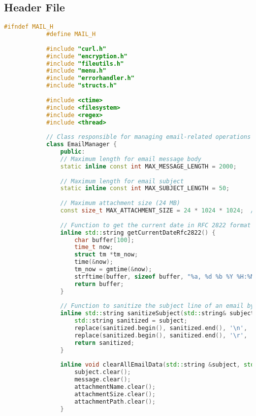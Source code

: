 \documentclass{article}
\begin{document}
	\subsection*{Header File}
	\begin{mdframed}[backgroundcolor=background, hidealllines=false, innerleftmargin=15pt, innerrightmargin=5pt, innertopmargin=0pt, innerbottommargin=-5pt, linecolor=accent]
		\begin{lstlisting}[language=C++]
			#ifndef MAIL_H
			#define MAIL_H
			
			#include "curl.h"
			#include "encryption.h"
			#include "fileutils.h"
			#include "menu.h"
			#include "errorhandler.h"
			#include "structs.h"
			
			#include <ctime>
			#include <filesystem>
			#include <regex>
			#include <thread>
			
			// Class responsible for managing email-related operations
			class EmailManager {
				public:
				// Maximum length for email message body
				static inline const int MAX_MESSAGE_LENGTH = 2000;
				
				// Maximum length for email subject
				static inline const int MAX_SUBJECT_LENGTH = 50;
				
				// Maximum attachment size (24 MB)
				const size_t MAX_ATTACHMENT_SIZE = 24 * 1024 * 1024;  // 24 MB in bytes
				
				// Function to get the current date in RFC 2822 format
				inline std::string getCurrentDateRfc2822() {
					char buffer[100];
					time_t now;
					struct tm *tm_now;
					time(&now);
					tm_now = gmtime(&now);
					strftime(buffer, sizeof buffer, "%a, %d %b %Y %H:%M:%S %Z", tm_now);
					return buffer;
				}
				
				// Function to sanitize the subject line of an email by replacing newline and carriage return characters with spaces
				inline std::string sanitizeSubject(std::string& subject) {
					std::string sanitized = subject;
					replace(sanitized.begin(), sanitized.end(), '\n', ' '); // replace newlines with spaces
					replace(sanitized.begin(), sanitized.end(), '\r', ' '); // replace carriage returns with spaces
					return sanitized;
				}
				
				inline void clearAllEmailData(std::string &subject, std::string &message, std::string &attachmentName, std::string &attachmentSize, std::string &attachmentPath) {
					subject.clear();
					message.clear();
					attachmentName.clear();
					attachmentSize.clear();
					attachmentPath.clear();
				}
				

\end{lstlisting}
\end{mdframed}
\end{document}
